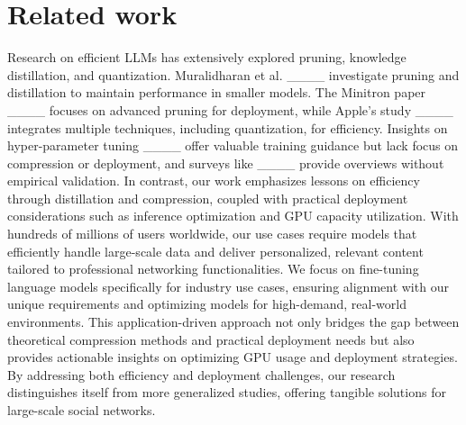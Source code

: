 \section{Related work}
\label{section:rel_work}

Research on efficient LLMs has extensively explored pruning, knowledge distillation, and quantization. Muralidharan et al. ____ investigate pruning and distillation to maintain performance in smaller models. The Minitron paper ____ focuses on advanced pruning for deployment, while Apple's study ____ integrates multiple techniques, including quantization, for efficiency. Insights on hyper-parameter tuning ____ offer valuable training guidance but lack focus on compression or deployment, and surveys like ____ provide overviews without empirical validation. In contrast, our work emphasizes lessons on efficiency through distillation and compression, coupled with practical deployment considerations such as inference optimization and GPU capacity utilization. With hundreds of millions of users worldwide, our use cases require models that efficiently handle large-scale data and deliver personalized, relevant content tailored to professional networking functionalities. We focus on fine-tuning language models specifically for industry use cases, ensuring alignment with our unique requirements and optimizing models for high-demand, real-world environments. This application-driven approach not only bridges the gap between theoretical compression methods and practical deployment needs but also provides actionable insights on optimizing GPU usage and deployment strategies. By addressing both efficiency and deployment challenges, our research distinguishes itself from more generalized studies, offering tangible solutions for large-scale social networks.